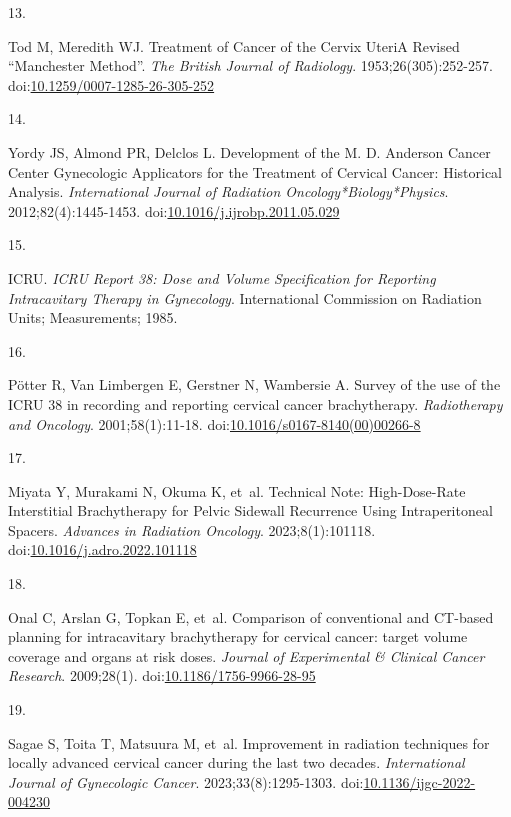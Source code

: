 \documentclass[
  a4paper,
]{scrreprt}
\newlength{\cslhangindent}
\newlength{\csllabelwidth}
\newlength{\cslentryspacingunit} %
\newenvironment{CSLReferences}[2] %
 {%
  \setlength{\parindent}{0pt}
  \ifodd #1
  \let\oldpar\par
  \def\par{\hangindent=\cslhangindent\oldpar}
  \fi
  \setlength{\parskip}{#2\cslentryspacingunit}
 }%
 {}
\newcommand{\CSLLeftMargin}[1]{\parbox[t]{\csllabelwidth}{#1}}
\newcommand{\CSLRightInline}[1]{\parbox[t]{\linewidth - \csllabelwidth}{#1}\break}
\begin{document}
\begin{CSLReferences}{0}{0}
\leavevmode{}%
\CSLLeftMargin{13. }%
\CSLRightInline{Tod M, Meredith WJ. Treatment of Cancer of the Cervix
Uteri{\textemdash}A Revised {``}Manchester Method{''}. \emph{The British
Journal of Radiology}. 1953;26(305):252-257.
doi:\href{https://doi.org/10.1259/0007-1285-26-305-252}{10.1259/0007-1285-26-305-252}}

\leavevmode{}%
\CSLLeftMargin{14. }%
\CSLRightInline{Yordy JS, Almond PR, Delclos L. Development of the M. D.
Anderson Cancer Center Gynecologic Applicators for the Treatment of
Cervical Cancer: Historical Analysis. \emph{International Journal of
Radiation Oncology*Biology*Physics}. 2012;82(4):1445-1453.
doi:\href{https://doi.org/10.1016/j.ijrobp.2011.05.029}{10.1016/j.ijrobp.2011.05.029}}

\leavevmode{}%
\CSLLeftMargin{15. }%
\CSLRightInline{ICRU. \emph{ICRU Report 38: Dose and Volume
Specification for Reporting Intracavitary Therapy in Gynecology}.
International Commission on Radiation Units; Measurements; 1985.}

\leavevmode{}%
\CSLLeftMargin{16. }%
\CSLRightInline{Pötter R, Van Limbergen E, Gerstner N, Wambersie A.
Survey of the use of the ICRU 38 in recording and reporting cervical
cancer brachytherapy. \emph{Radiotherapy and Oncology}.
2001;58(1):11-18.
doi:\href{https://doi.org/10.1016/s0167-8140(00)00266-8}{10.1016/s0167-8140(00)00266-8}}

\leavevmode{}%
\CSLLeftMargin{17. }%
\CSLRightInline{Miyata Y, Murakami N, Okuma K, et~al. Technical Note:
High-Dose-Rate Interstitial Brachytherapy for Pelvic Sidewall Recurrence
Using Intraperitoneal Spacers. \emph{Advances in Radiation Oncology}.
2023;8(1):101118.
doi:\href{https://doi.org/10.1016/j.adro.2022.101118}{10.1016/j.adro.2022.101118}}

\leavevmode{}%
\CSLLeftMargin{18. }%
\CSLRightInline{Onal C, Arslan G, Topkan E, et~al. Comparison of
conventional and CT-based planning for intracavitary brachytherapy for
cervical cancer: target volume coverage and organs at risk doses.
\emph{Journal of Experimental \& Clinical Cancer Research}. 2009;28(1).
doi:\href{https://doi.org/10.1186/1756-9966-28-95}{10.1186/1756-9966-28-95}}

\leavevmode{}%
\CSLLeftMargin{19. }%
\CSLRightInline{Sagae S, Toita T, Matsuura M, et~al. Improvement in
radiation techniques for locally advanced cervical cancer during the
last two decades. \emph{International Journal of Gynecologic Cancer}.
2023;33(8):1295-1303.
doi:\href{https://doi.org/10.1136/ijgc-2022-004230}{10.1136/ijgc-2022-004230}}


\end{CSLReferences}
\end{document}
